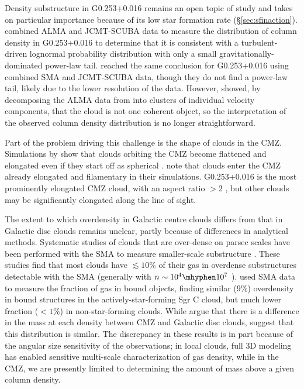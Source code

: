 Density substructure in G0.253+0.016 remains an open topic of study and takes on particular importance because of its low star formation rate (\S \ref{sec:sfinaction}).
\citet{Rathborne2014b} combined ALMA and JCMT-SCUBA data to measure the distribution of column density in G0.253+0.016 to determine that it is consistent with a turbulent-driven lognormal probability distribution with only a small gravitationally-dominated power-law tail. \citet{Johnston2014} reached the same conclusion for G0.253+0.016 using combined SMA and JCMT-SCUBA data, though they do not find a power-law tail, likely due to the lower resolution of the data.
However, \citet{Henshaw2019} showed, by decomposing the ALMA data from \citet{Rathborne2014b} into clusters of individual velocity components, that the cloud is not one coherent object, so the interpretation of the observed column density distribution is no longer straightforward.

Part of the problem driving this challenge is the shape of clouds in the CMZ.
Simulations by \citet{Dale2019} show that clouds orbiting the CMZ become flattened and elongated even if they start off as spherical  \citep[see also][]{Kruijssen2019,Petkova2021}.
\citet{Tress2020} note that clouds enter the CMZ already elongated and filamentary in their simulations.
G0.253+0.016 is the most prominently elongated CMZ cloud, with an aspect ratio $>2$ \citep{Rathborne2014a}, but other clouds may be significantly elongated along the line of sight.

The extent to which overdensity in Galactic centre clouds differs from that in Galactic disc clouds remains unclear, partly because of differences in analytical methods.
Systematic studies of clouds that are over-dense on parsec scales have been performed with the SMA to measure smaller-scale substructure \citep[\S\ref{sec:incipientsf},][]{Kauffmann2017b,Battersby2020,Hatchfield2020}. These studies find that most clouds have $\lesssim10\%$ of their gas in overdense substructures detectable with the SMA (generally with $n\sim10^4\mhyphen10^7$ \percc).
\citet{Lu2019b} used SMA data to measure the fraction of gas in bound objects, finding similar (9\%) overdensity in bound structures in the actively-star-forming Sgr C cloud, but much lower fraction  ($<1\%$) in non-star-forming clouds.
While \citet{Kauffmann2017b} argue that there is a difference in the mass at each density between CMZ and Galactic disc clouds, \citet{Parmentier2020} suggest that this distribution is similar.
The discrepancy in these results is in part because of the angular size sensitivity of the observations; in local clouds, full 3D modeling has enabled sensitive multi-scale characterization of gas density, while in the CMZ, we are presently limited to determining the amount of mass above a given column density.

